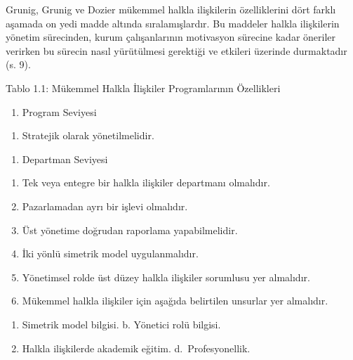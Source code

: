 \documentclass[
]{book}
\providecommand{\tightlist}{%
  \setlength{\itemsep}{0pt}\setlength{\parskip}{0pt}}
\begin{document}
Grunig, Grunig ve Dozier mükemmel halkla ilişkilerin özelliklerini dört farklı aşamada on yedi madde altında sıralamışlardır. Bu maddeler halkla ilişkilerin yönetim sürecinden, kurum çalışanlarının motivasyon sürecine kadar öneriler verirken bu sürecin nasıl yürütülmesi gerektiği ve etkileri üzerinde durmaktadır (s. 9). \citep{grunig2002excellent}

Tablo 1.1: Mükemmel Halkla İlişkiler Programlarının Özellikleri

\begin{enumerate}
\def\labelenumi{\Roman{enumi}.}
\tightlist
\item
  Program Seviyesi
\end{enumerate}

\begin{enumerate}
\def\labelenumi{\arabic{enumi}.}
\tightlist
\item
  Stratejik olarak yönetilmelidir.
\end{enumerate}

\begin{enumerate}
\def\labelenumi{\Roman{enumi}.}
\setcounter{enumi}{1}
\tightlist
\item
  Departman Seviyesi
\end{enumerate}

\begin{enumerate}
\def\labelenumi{\arabic{enumi}.}
\setcounter{enumi}{1}
\tightlist
\item
  Tek veya entegre bir halkla ilişkiler departmanı olmalıdır.
\item
  Pazarlamadan ayrı bir işlevi olmalıdır.
\item
  Üst yönetime doğrudan raporlama yapabilmelidir.
\item
  İki yönlü simetrik model uygulanmalıdır.
\item
  Yönetimsel rolde üst düzey halkla ilişkiler sorumlusu yer almalıdır.
\item
  Mükemmel halkla ilişkiler için aşağıda belirtilen unsurlar yer almalıdır.\\
\end{enumerate}

\begin{enumerate}
\def\labelenumi{\alph{enumi}.}
\tightlist
\item
  Simetrik model bilgisi. b. Yönetici rolü bilgisi.
\item
  Halkla ilişkilerde akademik eğitim. d.~Profesyonellik.
\end{enumerate}
\end{document}
